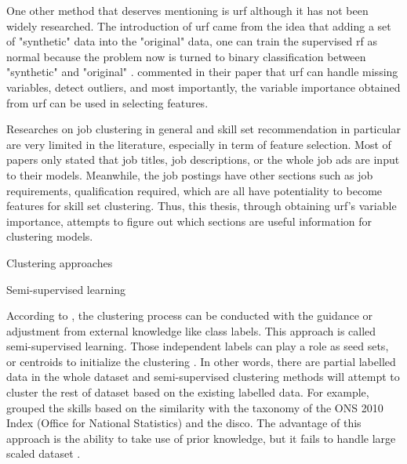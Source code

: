 \documentclass[a4paper,man,floatsintext,natbib,noextraspace]{apa6}
\makeatletter
\renewcommand{\subsection}{\@startsection{subsection}{2}
  {\z@}
  {\b@level@two@skip}
  {\e@level@two@skip}
  {\normalfont\normalsize\bfseries}}
\renewcommand{\subsubsection}{\@startsection{subsubsection}{3}
  {\z@}
  {\b@level@two@skip}
  {\e@level@two@skip}
  {\normalfont\normalsize\bfseries\itshape}}
\makeatother
\begin{document}
One other method that deserves mentioning is \gls{urf} although it has not been widely researched. The introduction of \gls{urf} came from the idea that adding a set of "synthetic" data into the "original" data, one can train the supervised \gls{rf} as normal because the problem now is turned to binary classification between "synthetic" and "original" \citep{breimanManualSettingUsing2002}. \cite{elghazelUnsupervisedFeatureSelection2015} commented in their paper that \gls{urf} can handle missing variables, detect outliers, and most importantly, the variable importance obtained from \gls{urf} can be used in selecting features.

Researches on job clustering in general and skill set recommendation in particular are very limited in the literature, especially in term of feature selection. Most of papers only stated that job titles, job descriptions, or the whole job ads are input to their models. Meanwhile, the job postings have other sections such as job requirements, qualification required, which are all have potentiality to become features for skill set clustering. Thus, this thesis, through obtaining \gls{urf}'s variable importance, attempts to figure out which sections are useful information for clustering models.

\subsection{Clustering approaches}

\subsubsection{Semi-supervised learning}

According to \cite{griraUnsupervisedSemisupervisedClustering2005}, the clustering process can be conducted with the guidance or adjustment from external knowledge like class labels. This approach is called semi-supervised learning. Those independent labels can play a role as seed sets, or centroids to initialize the clustering \citep{qinResearchProgressSemiSupervised2019}. In other words, there are partial labelled data in the whole dataset and semi-supervised clustering methods will attempt to cluster the rest of dataset based on the existing labelled data. For example, \cite{djumalievaClassifyingOccupationsAccording2018} grouped the skills based on the similarity with the taxonomy of the ONS 2010 Index (Office for National Statistics) and the \gls{disco}. The advantage of this approach is the ability to take use of prior knowledge, but it fails to handle large scaled dataset \citep{reddySemisupervisedLearningBrief2018}.
\end{document}
